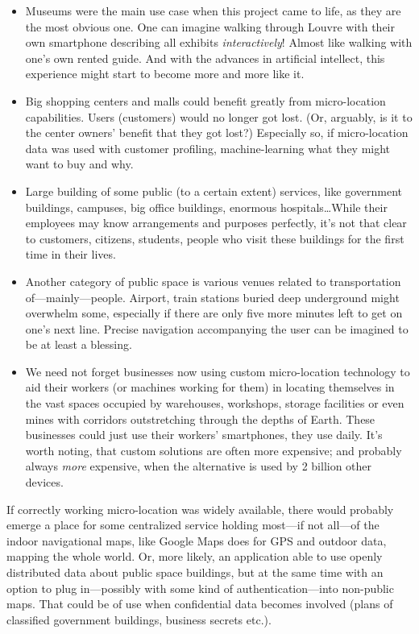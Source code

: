 \begin{itemize}
	\item Museums were the main use case when this project came to life, as they are the most obvious one. One can imagine walking through Louvre with their own smartphone describing all exhibits \emph{interactively}! Almost like walking with one's own rented guide. And with the advances in artificial intellect, this experience might start to become more and more like it.
	
	\item Big shopping centers and malls could benefit greatly from micro-location capabilities. Users (customers) would no longer got lost. (Or, arguably, is it to the center owners' benefit that they got lost?) Especially so, if micro-location data was used with customer profiling, machine-learning what they might want to buy and why.
	
	\item Large building of some public (to a certain extent) services, like government buildings, campuses, big office buildings, enormous hospitals\ldots While their employees may know arrangements and purposes perfectly, it's not that clear to customers, citizens, students, people who visit these buildings for the first time in their lives.
	
	\item Another category of public space is various venues related to transportation of---mainly---people. Airport, train stations buried deep underground might overwhelm some, especially if there are only five more minutes left to get on one's next line. Precise navigation accompanying the user can be imagined to be at least a blessing.

	\item We need not forget businesses now using custom micro-location technology to aid their workers (or machines working for them) in locating themselves in the vast spaces occupied by warehouses, workshops, storage facilities or even mines with corridors outstretching through the depths of Earth. These businesses could just use their workers' smartphones, they use daily. It's worth noting, that custom solutions are often more expensive; and probably always \emph{more} expensive, when the alternative is used by 2 billion other devices.
\end{itemize}

If correctly working micro-location was widely available, there would probably emerge a place for some centralized service holding most---if not all---of the indoor navigational maps, like Google Maps does for GPS and outdoor data, mapping the whole world. Or, more likely, an application able to use openly distributed data about public space buildings, but at the same time with an option to plug in---possibly with some kind of authentication---into non-public maps. That could be of use when confidential data becomes involved (plans of classified government buildings, business secrets etc.).

